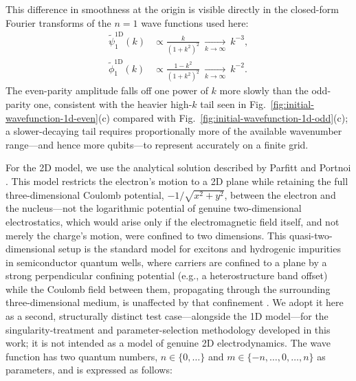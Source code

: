 \documentclass[aip-draft.tex]{subfiles}
\begin{document}
This difference in smoothness at the origin is visible directly in the
closed-form Fourier transforms of the $n=1$ wave functions used here:
\begin{align}
\tilde\psi_1^{\mathrm{1D}}(k) &\propto \frac{k}{(1+k^2)^2}
\ \xrightarrow[k\to\infty]{}\ k^{-3},\\
\tilde\phi_1^{\mathrm{1D}}(k) &\propto \frac{1-k^2}{(1+k^2)^2}
\ \xrightarrow[k\to\infty]{}\ k^{-2}.
\end{align}
The even-parity amplitude falls off one power of $k$ more slowly than the
odd-parity one, consistent with the heavier high-$k$ tail seen in
Fig.~\ref{fig:initial-wavefunction-1d-even}(c) compared with
Fig.~\ref{fig:initial-wavefunction-1d-odd}(c); a slower-decaying tail
requires proportionally more of the available wavenumber range---and hence
more qubits---to represent accurately on a finite grid.

For the 2D model, we use the analytical solution described by Parfitt and
Portnoi \cite{Parfitt2002.10.1063/1.1503868}. This model restricts the
electron's motion to a 2D plane while retaining the full three-dimensional
Coulomb potential, $-1/\sqrt{x^2+y^2}$, between the electron and the
nucleus---not the logarithmic potential of genuine two-dimensional
electrostatics, which would arise only if the electromagnetic field
itself, and not merely the charge's motion, were confined to two
dimensions. This quasi-two-dimensional setup is the standard model for
excitons and hydrogenic impurities in semiconductor quantum wells, where
carriers are confined to a plane by a strong perpendicular confining
potential (e.g., a heterostructure band offset) while the Coulomb field
between them, propagating through the surrounding three-dimensional
medium, is unaffected by that confinement \cite{Parfitt2002.10.1063/1.1503868}.
We adopt it here as a second, structurally distinct test case---alongside
the 1D model---for the singularity-treatment and parameter-selection
methodology developed in this work; it is not intended as a model of
genuine 2D electrodynamics. The wave function
has two quantum numbers, $n\in\{0,\ldots\}$ and $m\in\{-n,\ldots,0,\ldots,n\}$ as
parameters, and is expressed as follows:
\end{document}
